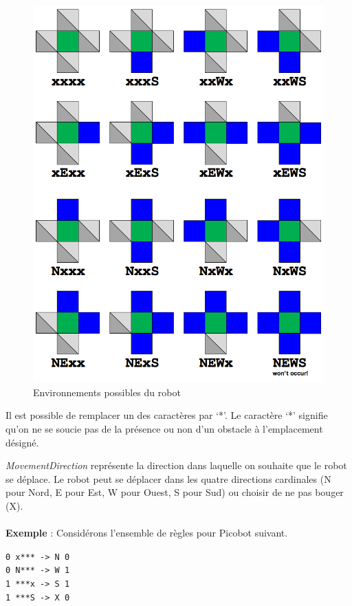 \documentclass{article}
\begin{document}
\begin{figure}[H]
\centerline{
\includegraphics[scale=0.3]{pictures/Image0.png}}
\caption{Environnements possibles du robot}
\end{figure}

Il est possible de remplacer un des caractères par ‘*’. Le caractère ‘*’ signifie qu’on ne se soucie pas de la présence ou non d’un obstacle à l’emplacement désigné.
\vspace{5mm}

\textit{MovementDirection} représente la direction dans laquelle on souhaite que le robot se déplace. Le robot peut se déplacer dans les quatre directions cardinales (N pour Nord, E pour Est, W pour Ouest, S pour Sud) ou choisir de ne pas bouger (X).
\\\\
\noindent\textbf{Exemple} : Considérons l’ensemble de règles pour Picobot suivant.
\begin{center}
\texttt{0 x*** -> N 0\\
0 N*** -> W 1\\
1 ***x -> S 1\\
1 ***S -> X 0}
\end{center}
\end{document}
